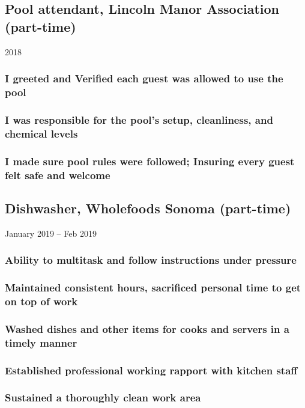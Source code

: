 \documentclass{article}
\begin{document}
	\subsection{Pool attendant, Lincoln Manor Association (part-time)} 2018
		\vspace{-2mm}

		\subsubsection{I greeted and Verified each guest was allowed to use the pool}
		\subsubsection{I was responsible for the pool's setup, cleanliness, and chemical levels}
		\subsubsection{I made sure pool rules were followed; Insuring every guest felt safe and welcome}

	\subsection{Dishwasher, Wholefoods Sonoma (part-time)} January 2019 – Feb 2019
		\vspace{-2mm}
		\subsubsection{Ability to multitask and follow instructions under pressure}
		\subsubsection{Maintained consistent hours, sacrificed personal time to get on top of work}
		\subsubsection{Washed dishes and other items for cooks and servers in a timely manner}
		\subsubsection{Established professional working rapport with kitchen staff}
		\subsubsection{Sustained a thoroughly clean work area}
\end{document}
